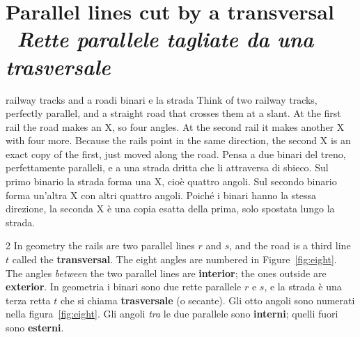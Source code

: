 \documentclass[10pt,a4paper,oneside]{book}
\newif\ifIT
\newenvironment{bi}%
  {\begin{paracol}{2}\global\ITfalse\selectlanguage{english}}%
  {\end{paracol}}
\newcommand{\IT}{\switchcolumn\global\ITtrue\selectlanguage{italian}}
\newcommand{\bisection}[2]{%
  \Needspace{7\baselineskip}%
  \section[#1 \textperiodcentered\ #2]{#1 {\color{itgreen}\itshape\,\textperiodcentered\ #2}}}
\begin{document}
\bisection{Parallel lines cut by a transversal}{Rette parallele tagliate da una trasversale}\label{sec:parallel}
\begin{anchor}{railway tracks and a road}{i binari e la strada}
Think of two railway tracks, perfectly parallel, and a straight road that crosses them at a slant. At the first rail the road makes an X, so four angles. At the second rail it makes another X with four more. Because the rails point in the same direction, the second X is an exact copy of the first, just moved along the road.
\tcblower
Pensa a due binari del treno, perfettamente paralleli, e a una strada dritta che li attraversa di sbieco. Sul primo binario la strada forma una X, cioè quattro angoli. Sul secondo binario forma un'altra X con altri quattro angoli. Poiché i binari hanno la stessa direzione, la seconda X è una copia esatta della prima, solo spostata lungo la strada.
\end{anchor}

\begin{bi}
In geometry the rails are two parallel lines $r$ and $s$, and the road is a third line $t$ called the \textbf{transversal}. The eight angles are numbered in Figure~\ref{fig:eight}. The angles \emph{between} the two parallel lines are \textbf{interior}; the ones outside are \textbf{exterior}.
\IT
In geometria i binari sono due rette parallele $r$ e $s$, e la strada è una terza retta $t$ che si chiama \textbf{trasversale} (o secante). Gli otto angoli sono numerati nella figura~\ref{fig:eight}. Gli angoli \emph{tra} le due parallele sono \textbf{interni}; quelli fuori sono \textbf{esterni}.
\end{bi}
\end{document}
